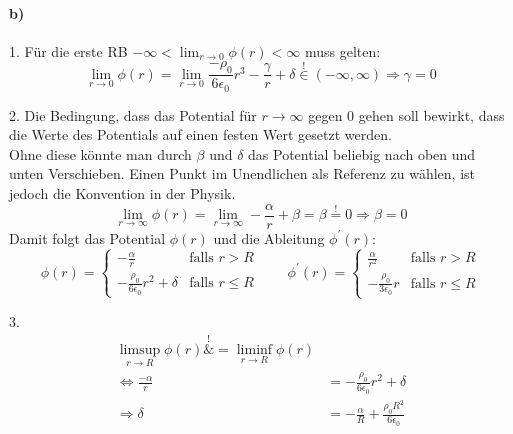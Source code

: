 \documentclass{article}
\newcommand{\epsz}{\epsilon_0}
\begin{document}
\paragraph{b)}
\par{1.}
Für die erste RB $-\infty < \lim_{r\rightarrow 0} \phi(r) < \infty$ muss
gelten:
\[
	\lim_{r\rightarrow 0} \phi(r) = \lim_{r\rightarrow 0}
	\frac{- \rho_0 }{6  \epsz} r^3 - \frac \gamma r + \delta
	\overset{!}{\in} (-\infty, \infty)
	\Rightarrow
	\gamma = 0
\]
\par{2.}
Die Bedingung, dass das Potential für $r \rightarrow \infty$ gegen 0 gehen
soll bewirkt, dass die Werte des Potentials auf einen festen Wert gesetzt werden. \\
Ohne diese könnte man durch $\beta$ und $\delta$ das Potential beliebig nach
oben und unten Verschieben. Einen Punkt im Unendlichen als Referenz zu
wählen, ist jedoch die Konvention in der Physik.
\[
	\lim_{r \rightarrow \infty} \phi(r) = \lim_{r \rightarrow \infty}
	-\frac{\alpha}{r} + \beta = \beta \overset{!}{=} 0
	\Rightarrow \beta = 0
\]
Damit folgt das Potential $\phi(r)$ und die Ableitung $\phi^\prime(r)$:
\[
	\phi(r) =
	\begin{cases}
		-\frac \alpha r & \text{falls } r > R \\
		-\frac{\rho_0}{6\epsz} r^2 + \delta
		& \text{falls } r \leq R
	\end{cases}
	\qquad
	\phi^\prime(r) =
	\begin{cases}
		\frac\alpha{r^2}
		& \text{falls } r > R \\
		-\frac{\rho_0}{3\epsz} r
		& \text{falls } r \leq R
	\end{cases}
\]
\newpage
\par{3.}
\begin{align*}
	\limsup_{r\rightarrow R} \phi(r) \overset{!}&{=} 
	\liminf_{r\rightarrow R} \phi(r) \\
	\Leftrightarrow
	\frac{-\alpha}{r}
	&=  -\frac{\rho_0}{6\epsz} r^2 + \delta \\
	\Rightarrow
	\delta &= -\frac{\alpha}{R} + \frac{\rho_0 R^2}{6 \epsz}
\end{align*}
\end{document}
